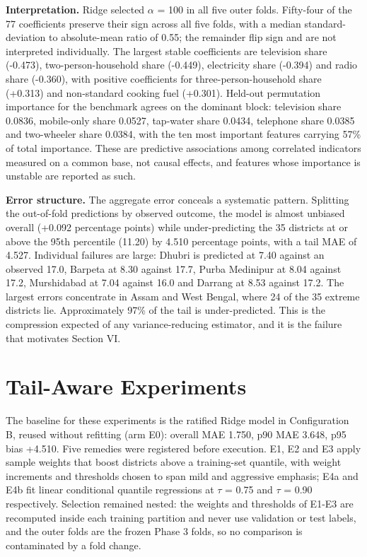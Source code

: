 \documentclass[conference]{IEEEtran}
\begin{document}
\textbf{Interpretation.} Ridge selected $\alpha$ = 100 in all five outer folds. Fifty-four of the 77 coefficients preserve their sign across all five folds, with a median standard-deviation to absolute-mean ratio of 0.55; the remainder flip sign and are not interpreted individually. The largest stable coefficients are television share (-0.473), two-person-household share (-0.449), electricity share (-0.394) and radio share (-0.360), with positive coefficients for three-person-household share (+0.313) and non-standard cooking fuel (+0.301). Held-out permutation importance for the benchmark agrees on the dominant block: television share 0.0836, mobile-only share 0.0527, tap-water share 0.0434, telephone share 0.0385 and two-wheeler share 0.0384, with the ten most important features carrying 57\% of total importance. These are predictive associations among correlated indicators measured on a common base, not causal effects, and features whose importance is unstable are reported as such.

\textbf{Error structure.} The aggregate error conceals a systematic pattern. Splitting the out-of-fold predictions by observed outcome, the model is almost unbiased overall (+0.092 percentage points) while under-predicting the 35 districts at or above the 95th percentile (11.20) by 4.510 percentage points, with a tail MAE of 4.527. Individual failures are large: Dhubri is predicted at 7.40 against an observed 17.0, Barpeta at 8.30 against 17.7, Purba Medinipur at 8.04 against 17.2, Murshidabad at 7.04 against 16.0 and Darrang at 8.53 against 17.2. The largest errors concentrate in Assam and West Bengal, where 24 of the 35 extreme districts lie. Approximately 97\% of the tail is under-predicted. This is the compression expected of any variance-reducing estimator, and it is the failure that motivates Section VI.

\section{Tail-Aware Experiments}

The baseline for these experiments is the ratified Ridge model in Configuration B, reused without refitting (arm E0): overall MAE 1.750, p90 MAE 3.648, p95 bias +4.510. Five remedies were registered before execution. E1, E2 and E3 apply sample weights that boost districts above a training-set quantile, with weight increments and thresholds chosen to span mild and aggressive emphasis; E4a and E4b fit linear conditional quantile regressions at $\tau$ = 0.75 and $\tau$ = 0.90 respectively. Selection remained nested: the weights and thresholds of E1-E3 are recomputed inside each training partition and never use validation or test labels, and the outer folds are the frozen Phase 3 folds, so no comparison is contaminated by a fold change.
\end{document}
